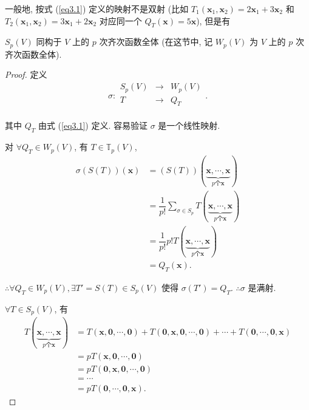\documentclass{ctexart}
\begin{document}
一般地, 按式 (\ref{eq3.1}) 定义的映射不是双射 (比如 $T_1(\boldsymbol{x}_1,\boldsymbol{x}_2)=2\boldsymbol{x}_1+3\boldsymbol{x}_2$ 和 $T_2(\boldsymbol{x}_1,\boldsymbol{x}_2)=3\boldsymbol{x}_1+2\boldsymbol{x}_2$ 对应同一个 $Q_T(\boldsymbol{x})=5\boldsymbol{x}$), 但是有
\begin{theorem}[书上的定理 3]\label{t3.1}
    $S_p(V)$ 同构于 $V$ 上的 $p$ 次齐次函数全体 (在这节中, 记 $W_p(V)$ 为 $V$ 上的 $p$ 次齐次函数全体).
\end{theorem}
\begin{proof}
    定义
    \[\sigma:\begin{array}{rcl}
        S_p(V) & \rightarrow & W_p(V) \\
        T & \rightarrow & Q_T \\
    \end{array}.\]

    其中 $Q_T$ 由式 (\ref{eq3.1}) 定义. 容易验证 $\sigma$ 是一个线性映射.

    对 $\forall Q_T\in W_p(V)$, 有 $T\in\mathbb{T}_p(V)$,
    \begin{align*}
        \sigma(S(T))(\boldsymbol{x}) & =(S(T))(\underbrace{\boldsymbol{x},\cdots,\boldsymbol{x}}_{p\text{个}\boldsymbol{x}}) \\
        & =\dfrac{1}{p!}\sum\limits_{\sigma\in S_p}T(\underbrace{\boldsymbol{x},\cdots,\boldsymbol{x}}_{p\text{个}\boldsymbol{x}}) \\
        & =\dfrac{1}{p!}p!T(\underbrace{\boldsymbol{x},\cdots,\boldsymbol{x}}_{p\text{个}\boldsymbol{x}}) \\
        & =Q_T(\boldsymbol{x}).
    \end{align*}

    $\therefore\forall Q_T\in W_p(V),\exists T'=S(T)\in S_p(V)$ 使得 $\sigma(T')=Q_T$. $\therefore\sigma$ 是满射.

    $\forall T\in S_p(V)$, 有
    \begin{align*}
        T(\underbrace{\boldsymbol{x},\cdots,\boldsymbol{x}}_{p\text{个}\boldsymbol{x}}) & =T(\boldsymbol{x},\boldsymbol{0},\cdots,\boldsymbol{0})+T(\boldsymbol{0},\boldsymbol{x},\boldsymbol{0},\cdots,\boldsymbol{0})+\cdots+T(\boldsymbol{0},\cdots,\boldsymbol{0},\boldsymbol{x}) \\
        & =pT(\boldsymbol{x},\boldsymbol{0},\cdots,\boldsymbol{0}) \\
        & =pT(\boldsymbol{0},\boldsymbol{x},\boldsymbol{0},\cdots,\boldsymbol{0}) \\
        & =\cdots \\
        & =pT(\boldsymbol{0},\cdots,\boldsymbol{0},\boldsymbol{x}).
    \end{align*}


\end{proof}
\end{document}
